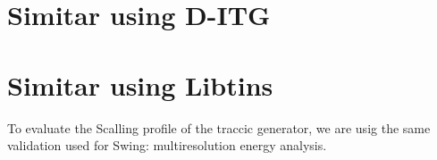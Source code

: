 \section{Simitar using D-ITG}

\section{Simitar using Libtins}




To evaluate the Scalling profile of the traccic generator, we are usig the same validation used for Swing\cite{swing-paper}: multiresolution energy analysis.

